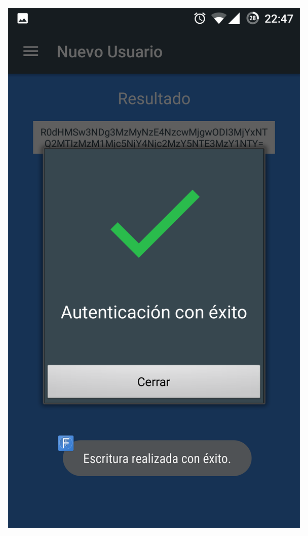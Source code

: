 \documentclass[../PFC.tex]{subfiles}
\begin{document}
\begin{figure}[H]
\centering
	\begin{subfigure}{0.4\textwidth}
		\centering
		\includegraphics[width=0.85\textwidth]{./img/app/validacionExitoEscrito}
    \end{subfigure}          
    \qquad\qquad\qquad  %
    \begin{subfigure}{0.4\textwidth}  
       \centering

\end{subfigure}
\end{figure}
\end{document}
